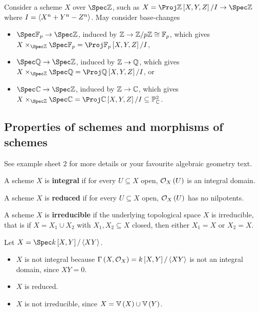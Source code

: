 \begin{example*}
Consider a scheme $ X $ over $ \Spec \ZZ $, such as $ X = \Proj \ZZ\sbr{X, Y, Z} / I \to \Spec \ZZ $ where $ I = \left\langle X^n + Y^n - Z^n \right\rangle $. May consider base-changes
\begin{itemize}
\item $ \Spec \FF_p \to \Spec \ZZ $, induced by $ \mathbb{Z} \to \mathbb{Z} / p\mathbb{Z} \cong \mathbb{F}_p $, which gives $ X \times_{\Spec \ZZ} \Spec \FF_p = \Proj \FF_p\sbr{X, Y, Z} / I $,
\item $ \Spec \QQ \to \Spec \ZZ $, induced by $ \mathbb{Z} \to \mathbb{Q} $, which gives $ X \times_{\Spec \ZZ} \Spec \QQ = \Proj \QQ\sbr{X, Y, Z} / I $, or
\item $ \Spec \CC \to \Spec \ZZ $, induced by $ \mathbb{Z} \to \mathbb{C} $, which gives $ X \times_{\Spec \ZZ} \Spec \CC = \Proj \CC\sbr{X, Y, Z} / I \subseteq \PP_\CC^2 $.
\end{itemize}
\end{example*}

\subsection{Properties of schemes and morphisms of schemes}

See example sheet $ 2 $ for more details or your favourite algebraic geometry text.

\begin{definition*}
A scheme $ X $ is \textbf{integral} if for every $ U \subseteq X $ open, $ \OOO_X\br{U} $ is an integral domain.
\end{definition*}

\begin{definition*}
A scheme $ X $ is \textbf{reduced} if for every $ U \subseteq X $ open, $ \OOO_X\br{U} $ has no nilpotents.
\end{definition*}

\begin{definition*}
A scheme $ X $ is \textbf{irreducible} if the underlying topological space $ X $ is irreducible, that is if $ X = X_1 \cup X_2 $ with $ X_1, X_2 \subseteq X $ closed, then either $ X_1 = X $ or $ X_2 = X $.
\end{definition*}

\begin{example*}
Let $ X = \Spec k\sbr{X, Y} / \abr{XY} $.
\begin{itemize}
\item $ X $ is not integral because $ \Gamma\br{X, \OOO_X} = k\sbr{X, Y} / \abr{XY} $ is not an integral domain, since $ XY = 0 $.
\item $ X $ is reduced.
\item $ X $ is not irreducible, since $ X = \VV\br{X} \cup \VV\br{Y} $.
\end{itemize}
\end{example*}

